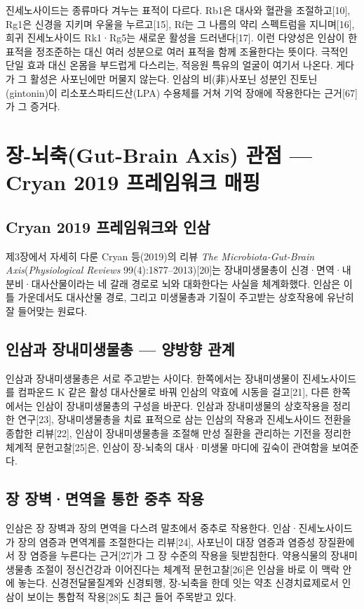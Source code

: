 \documentclass[12pt,oneside]{book}
\begin{document}
진세노사이드는 종류마다 겨누는 표적이 다르다. Rb1은 대사와 혈관을 조절하고[10], Rg1은 신경을 지키며 우울을 누르고[15], Rf는 그 나름의 약리 스펙트럼을 지니며[16], 희귀 진세노사이드 Rk1·Rg5는 새로운 활성을 드러낸다[17]. 이런 다양성은 인삼이 한 표적을 정조준하는 대신 여러 성분으로 여러 표적을 함께 조율한다는 뜻이다. 극적인 단일 효과 대신 온몸을 부드럽게 다스리는, 적응원 특유의 얼굴이 여기서 나온다. 게다가 그 활성은 사포닌에만 머물지 않는다. 인삼의 비(非)사포닌 성분인 진토닌(gintonin)이 리소포스파티드산(LPA) 수용체를 거쳐 기억 장애에 작용한다는 근거[67]가 그 증거다.

\section{장-뇌축(Gut-Brain Axis) 관점 — Cryan 2019 프레임워크 매핑}

\subsection{Cryan 2019 프레임워크와 인삼}

제3장에서 자세히 다룬 Cryan 등(2019)의 리뷰 \textit{The Microbiota-Gut-Brain Axis}(\textit{Physiological Reviews} 99(4):1877–2013)[20]는 장내미생물총이 신경·면역·내분비·대사산물이라는 네 갈래 경로로 뇌와 대화한다는 사실을 체계화했다. 인삼은 이 틀 가운데서도 대사산물 경로, 그리고 미생물총과 기질이 주고받는 상호작용에 유난히 잘 들어맞는 원료다.

\subsection{인삼과 장내미생물총 — 양방향 관계}

인삼과 장내미생물총은 서로 주고받는 사이다. 한쪽에서는 장내미생물이 진세노사이드를 컴파운드 K 같은 활성 대사산물로 바꿔 인삼의 약효에 시동을 걸고[21], 다른 한쪽에서는 인삼이 장내미생물총의 구성을 바꾼다. 인삼과 장내미생물의 상호작용을 정리한 연구[23], 장내미생물총을 치료 표적으로 삼는 인삼의 작용과 진세노사이드 전환을 종합한 리뷰[22], 인삼이 장내미생물총을 조절해 만성 질환을 관리하는 기전을 정리한 체계적 문헌고찰[25]은, 인삼이 장-뇌축의 대사·미생물 마디에 깊숙이 관여함을 보여준다.

\subsection{장 장벽·면역을 통한 중추 작용}

인삼은 장 장벽과 장의 면역을 다스려 말초에서 중추로 작용한다. 인삼·진세노사이드가 장의 염증과 면역계를 조절한다는 리뷰[24], 사포닌이 대장 염증과 염증성 장질환에서 장 염증을 누른다는 근거[27]가 그 장 수준의 작용을 뒷받침한다. 약용식물의 장내미생물총 조절이 정신건강과 이어진다는 체계적 문헌고찰[26]은 인삼을 바로 이 맥락 안에 놓는다. 신경전달물질계와 신경퇴행, 장-뇌축을 한데 잇는 약초 신경치료제로서 인삼이 보이는 통합적 작용[28]도 최근 들어 주목받고 있다.
\end{document}
